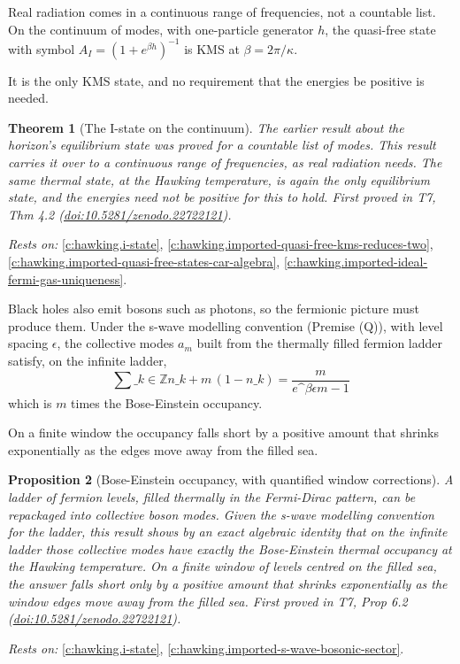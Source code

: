 \documentclass[11pt]{article}
\newtheorem{theorem}{Theorem}[section]
\newtheorem{proposition}[theorem]{Proposition}
\theoremstyle{definition}
\theoremstyle{plain}
\providecommand{\Z}{}\renewcommand{\Z}{\mathbb{Z}}
\begin{document}
Real radiation comes in a continuous range of frequencies, not a countable list. On the continuum of modes, with one-particle generator $h$, the quasi-free state with symbol $A_I = (1 + e^{\beta h})^{-1}$ is KMS at $\beta = 2\pi/\kappa$.

It is the only KMS state, and no requirement that the energies be positive is needed.

\begin{theorem}[The I-state on the continuum]\label{c:hawking.i-state-continuum}
The earlier result about the horizon's equilibrium state was proved for a countable list of modes. This result carries it over to a continuous range of frequencies, as real radiation needs. The same thermal state, at the Hawking temperature, is again the only equilibrium state, and the energies need not be positive for this to hold.
\emph{First proved in} T7, Thm 4.2 (\href{https://doi.org/10.5281/zenodo.22722121}{doi:10.5281/zenodo.22722121}).
\end{theorem}
\noindent\emph{Rests on:} \ref{c:hawking.i-state}, \ref{c:hawking.imported-quasi-free-kms-reduces-two}, \ref{c:hawking.imported-quasi-free-states-car-algebra}, \ref{c:hawking.imported-ideal-fermi-gas-uniqueness}.

Black holes also emit bosons such as photons, so the fermionic picture must produce them. Under the s-wave modelling convention (Premise (Q)), with level spacing $\epsilon$, the collective modes $a_m$ built from the thermally filled fermion ladder satisfy, on the infinite ladder, \[ \sum\_{k \in \Z} n\_{k+m}\,(1 - n\_k) = \frac{m}{e\^{}{\beta\epsilon m} - 1} \] which is $m$ times the Bose-Einstein occupancy.

On a finite window the occupancy falls short by a positive amount that shrinks exponentially as the edges move away from the filled sea.

\begin{proposition}[Bose-Einstein occupancy, with quantified window corrections]\label{c:hawking.bose-einstein-occupancy-quantified-window-corrections}
A ladder of fermion levels, filled thermally in the Fermi-Dirac pattern, can be repackaged into collective boson modes. Given the s-wave modelling convention for the ladder, this result shows by an exact algebraic identity that on the infinite ladder those collective modes have exactly the Bose-Einstein thermal occupancy at the Hawking temperature. On a finite window of levels centred on the filled sea, the answer falls short only by a positive amount that shrinks exponentially as the window edges move away from the filled sea.
\emph{First proved in} T7, Prop 6.2 (\href{https://doi.org/10.5281/zenodo.22722121}{doi:10.5281/zenodo.22722121}).
\end{proposition}
\noindent\emph{Rests on:} \ref{c:hawking.i-state}, \ref{c:hawking.imported-s-wave-bosonic-sector}.
\end{document}
